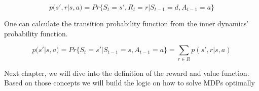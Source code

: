 \begin{equation}
    p(s',r | s,a) = Pr\{S_t = s', R_t = r | S_{t-1} = d, A_{t-1} = a\}
\end{equation}

One can calculate the transition probability function from the inner dynamics’ probability function.

\begin{equation}
    p(s'|s,a) = Pr\{S_t=s'| S_{t-1}=s, A_{t-1}=a\} = \sum_{r \in R}p(s',r|s,a)
\end{equation}

Next chapter, we will dive into the definition of the reward and value function. Based on those concepts we will build the logic on how to solve MDPs optimally